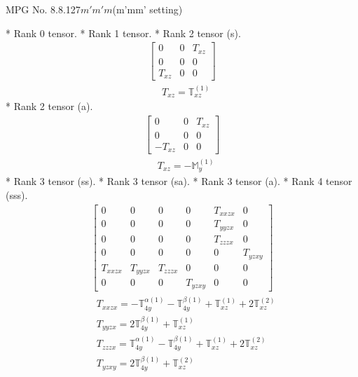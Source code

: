\documentclass[fleqn,8pt,landscape]{jsarticle}
\begin{document}
\setcounter{MaxMatrixCols}{32}

\renewcommand{\tablename}{Table~}
\renewcommand{\figurename}{Figure~}
\begin{center}
\LARGE
MPG No. 8.8.127\quad$m'm'm$\quad(m'mm' setting)
\end{center}
* Rank 0 tensor.
* Rank 1 tensor.
* Rank 2 tensor (s).
\begin{align*}
\begin{bmatrix} 0 & 0 & T_{xz} \\ 0 & 0 & 0 \\ T_{xz} & 0 & 0 \end{bmatrix}
\end{align*}
\begin{align*}
& T_{xz} = \mathbb{T}_{xz}^{(1)}
\end{align*}
* Rank 2 tensor (a).
\begin{align*}
\begin{bmatrix} 0 & 0 & T_{xz} \\ 0 & 0 & 0 \\ - T_{xz} & 0 & 0 \end{bmatrix}
\end{align*}
\begin{align*}
& T_{xz} = - \mathbb{M}_{y}^{(1)}
\end{align*}
* Rank 3 tensor (ss).
* Rank 3 tensor (sa).
* Rank 3 tensor (a).
* Rank 4 tensor (sss).
\begin{align*}
\begin{bmatrix} 0 & 0 & 0 & 0 & T_{xxzx} & 0 \\ 0 & 0 & 0 & 0 & T_{yyzx} & 0 \\ 0 & 0 & 0 & 0 & T_{zzzx} & 0 \\ 0 & 0 & 0 & 0 & 0 & T_{yzxy} \\ T_{xxzx} & T_{yyzx} & T_{zzzx} & 0 & 0 & 0 \\ 0 & 0 & 0 & T_{yzxy} & 0 & 0 \end{bmatrix}
\end{align*}
\begin{align*}
& T_{xxzx} = - \mathbb{T}_{4y}^{\alpha(1)} - \mathbb{T}_{4y}^{\beta(1)} + \mathbb{T}_{xz}^{(1)} + 2 \mathbb{T}_{xz}^{(2)} \\
& T_{yyzx} = 2 \mathbb{T}_{4y}^{\beta(1)} + \mathbb{T}_{xz}^{(1)} \\
& T_{zzzx} = \mathbb{T}_{4y}^{\alpha(1)} - \mathbb{T}_{4y}^{\beta(1)} + \mathbb{T}_{xz}^{(1)} + 2 \mathbb{T}_{xz}^{(2)} \\
& T_{yzxy} = 2 \mathbb{T}_{4y}^{\beta(1)} + \mathbb{T}_{xz}^{(2)}
\end{align*}
\end{document}
